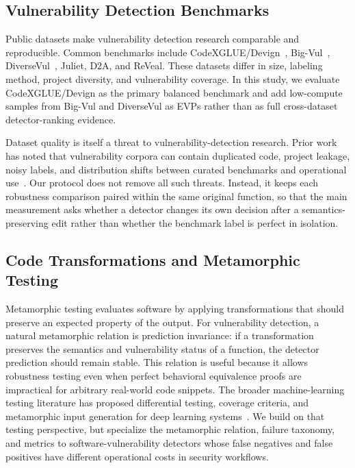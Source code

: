 \documentclass[a4paper,fleqn]{cas-dc}
\begin{document}
\subsection{Vulnerability Detection Benchmarks}

Public datasets make vulnerability detection research comparable and
reproducible. Common benchmarks include CodeXGLUE/Devign~\cite{lu2021codexglue,
zhou2019devign}, Big-Vul~\cite{fan2020bigvul}, DiverseVul~\cite{chen2023diversevul},
Juliet, D2A, and ReVeal. These datasets differ in size, labeling method,
project diversity, and vulnerability coverage. In this study, we evaluate
CodeXGLUE/Devign as the primary balanced benchmark and add low-compute samples
from Big-Vul and DiverseVul as EVPs rather than as full
cross-dataset detector-ranking evidence.

Dataset quality is itself a threat to vulnerability-detection research.
Prior work has noted that vulnerability corpora can contain duplicated code,
project leakage, noisy labels, and distribution shifts between curated
benchmarks and operational use~\cite{chakraborty2022reveal,zhou2019devign,
fan2020bigvul}. Our protocol does not remove all such threats. Instead, it
keeps each robustness comparison paired within the same original function, so
that the main measurement asks whether a detector changes its own decision
after a semantics-preserving edit rather than whether the benchmark label is
perfect in isolation.

\subsection{Code Transformations and Metamorphic Testing}

Metamorphic testing evaluates software by applying transformations that should
preserve an expected property of the output. For vulnerability detection, a
natural metamorphic relation is prediction invariance: if a transformation
preserves the semantics and vulnerability status of a function, the detector
prediction should remain stable. This relation is useful because it allows
robustness testing even when perfect behavioral equivalence proofs are
impractical for arbitrary real-world code snippets.
The broader machine-learning testing literature has proposed differential
testing, coverage criteria, and metamorphic input generation for deep learning
systems~\cite{pei2017deepxplore,tian2018deeptest,ma2018deepgauge,
zhang2022mltesting}. We build on that testing perspective, but specialize the
metamorphic relation, failure taxonomy, and metrics to software-vulnerability
detectors whose false negatives and false positives have different operational
costs in security workflows.
\end{document}
